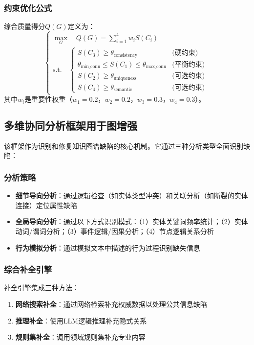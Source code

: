 \documentclass[runningheads]{llncs}
\begin{document}
\subsubsection{约束优化公式}
综合质量得分$Q(G)$定义为：
\begin{equation}
\label{eq:kg_quality_optimization}
\begin{cases}
\max_{G} \quad Q(G) = \sum_{i=1}^{4} w_i S(C_i) \\
\text{s.t.} \quad
\begin{cases}
S(C_3) \ge \theta_{\text{consistency}} & \text{(硬约束)} \\
\theta_{\text{min\_conn}} \le S(C_1) \le \theta_{\text{max\_conn}} & \text{(平衡约束)} \\
S(C_2) \ge \theta_{\text{uniqueness}} & \text{(可选约束)} \\
S(C_4) \ge \theta_{\text{semantic}} & \text{(可选约束)}
\end{cases}
\end{cases}
\end{equation}
其中$w_i$是重要性权重（$w_1=0.2$，$w_2=0.2$，$w_3=0.3$，$w_4=0.3$）。

\subsection{多维协同分析框架用于图增强}
\label{subsec:enhancement_framework}

该框架作为识别和修复知识图谱缺陷的核心机制。它通过三种分析类型全面识别缺陷：

\subsubsection{分析策略}
\begin{itemize}
    \item \textbf{细节导向分析}：通过逻辑检查（如实体类型冲突）和关联分析（如断裂的实体连接）定位属性缺陷
    \item \textbf{全局导向分析}：通过以下方式识别模式：（1）实体关键词频率统计；（2）实体动词/谓词分析；（3）事件逻辑/因果分析；（4）节点逻辑关系分析
    \item \textbf{行为模拟分析}：通过模拟文本中描述的行为过程识别缺失信息
\end{itemize}

\subsubsection{综合补全引擎}
补全引擎集成三种方法：
\begin{enumerate}
    \item \textbf{网络搜索补全}：通过网络检索补充权威数据以处理公共信息缺陷
    \item \textbf{推理补全}：使用LLM逻辑推理补充隐式关系
    \item \textbf{规则集补全}：调用领域规则集补充专业内容
\end{enumerate}
\end{document}
